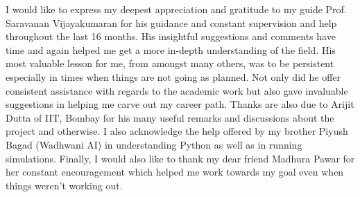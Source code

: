 \acknowledgments

I would like to express my deepest appreciation and gratitude to my guide Prof.
Saravanan Vijayakumaran for his guidance and constant supervision and help throughout the last 16 months. 
His insightful suggestions and comments have time and again helped me get a more in-depth understanding of the field.
His most valuable lesson for me, from amongst many others, was to be persistent especially in times when things are not going as planned. 
Not only did he offer consistent assistance with regards to the academic work but also gave invaluable suggestions in helping me carve out my career path. 
Thanks are also due to Arijit Dutta of IIT, Bombay for his many useful remarks and discussions about the project and otherwise. 
I also acknowledge the help offered by my brother Piyush Bagad (Wadhwani AI) in understanding Python as well as in running simulations. 
Finally, I would also like to thank my dear friend Madhura Pawar for her constant encouragement
which helped me work towards my goal even when things weren't working out.





\signature{\today}


